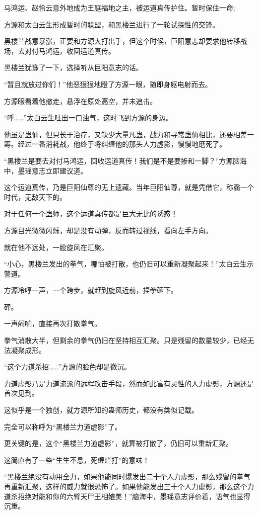 \begin{this_body}
马鸿运、赵怜云意外地成为王庭福地之主，被运道真传护住。暂时保住一命;

方源和太白云生形成暂时的联盟，和黑楼兰进行了一轮试探性的交锋。

黑楼兰战意暴涨，正要和方源大打出手，但这个时候，巨阳意志却要求他转移战场，去对付马鸿运，收回运道真传。

黑楼兰犹豫了一下，选择听从巨阳意志的话。

“暂且就放过你们！”他恶狠狠地瞪了方源一眼，随即身躯电射而去。

方源眼看着他撤走，悬浮在原处高空，并未追击。

“呼……”太白云生吐出一口浊气，这时飞到方源的身边。

他虽是蛊仙，但只长于治疗，又缺少大量凡蛊，战力和寻常蛊仙相比，还要相差一筹。经过一番消耗战，他终于将纠缠他的那头人力虚影，慢慢地磨死了。

“黑楼兰是要去对付马鸿运，回收运道真传！我们是不是要掺和一脚？”方源脑海中，墨瑶意志立即建议道。

这个运道真传，乃是巨阳仙尊的无上遗藏。当年巨阳仙尊，就是凭借它，称霸一个时代，无敌天下的。

对于任何一个蛊师，这个运道真传都是巨大无比的诱惑！

方源目光微微闪烁，却是没有动弹，反而转过视线，看向左手方向。

就在他不远处，一股旋风在汇聚。

“小心，黑楼兰发出的拳气，哪怕被打散，也仍旧可以重新凝聚起来！”太白云生示警道。

方源冷哼一声，一个跨步，就赶到旋风近前，捏拳砸下。

砰。

一声闷响，直接再次打散拳气。

拳气消散大半，但剩余的拳气仍旧在坚持相互汇聚。只是残留的数量较少，已经无法凝聚成形。

“这个力道杀招……”方源的脸色却是微沉。

力道虚影乃是力道流派的远程攻击手段，然而如此富有灵性的人力虚影，方源还是首次见到。

这似乎是一个独创，就方源所知的蛊师历史，都没有类似记载。

完全可以称呼为“黑楼兰力道虚影”了。

更关键的是，这个“黑楼兰力道虚影”，就算被打散了，仍旧可以重新汇聚。

这简直有了一些“生生不息，死缠烂打”的意味！

“黑楼兰绝没有动用全力，如果他能同时爆发出二十个人力虚影，那么残留的拳气再重新汇聚，这样的威力就很恐怖了。如果他能发出三十个人力虚影，那么这个力道杀招绝对能和你的六臂天尸王相媲美！”脑海中，墨瑶意志评价着，语气也显得沉重。


\end{this_body}
